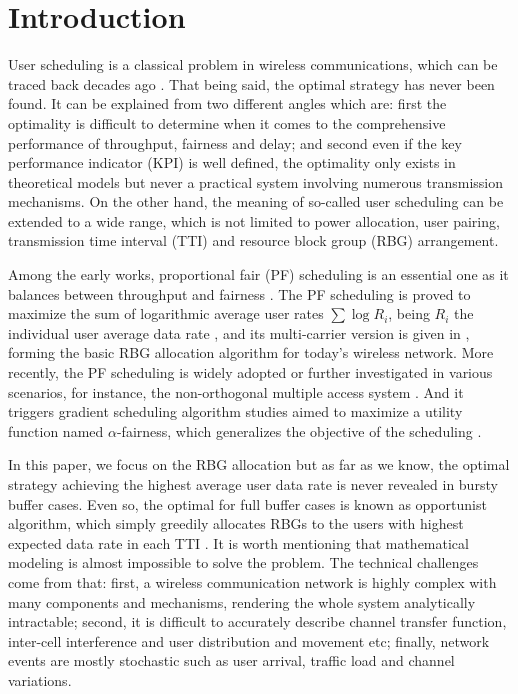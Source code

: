 \documentclass[conference,compsocconf]{IEEEtran}
\begin{document}
	\section{Introduction}
	
	User scheduling is a classical problem in wireless communications, which can be traced back decades ago \cite{borst2001dynamic}. That being said, the optimal strategy has never been found. It can be explained from two different angles which are: first the optimality is difficult to determine when it comes to the comprehensive performance of throughput, fairness and delay; and second even if the key performance indicator (KPI) is well defined, the optimality only exists in theoretical models but never a practical system involving numerous transmission mechanisms. On the other hand, the meaning of so-called user scheduling can be extended to a wide range, which is not limited to power allocation, user pairing, transmission time interval (TTI) and resource block group (RBG) arrangement.

    Among the early works, proportional fair (PF) scheduling is an essential one as it balances between throughput and fairness \cite{tse2001multiuser}. The PF scheduling is proved to maximize the sum of logarithmic average user rates $\sum \log R_i$, being $R_i$ the individual user average data rate \cite{kelly1998rate}, and its multi-carrier version is given in \cite{kim2005proportional}, forming the basic RBG allocation algorithm for today's wireless network. More recently, the PF scheduling is widely adopted or further investigated in various scenarios, for instance, the non-orthogonal multiple access system \cite{gemici2019user,saito2015system}. And it triggers gradient scheduling algorithm studies aimed to maximize a utility function named $\alpha$-fairness, which generalizes the objective of the scheduling \cite{ameigeiras2012traffic}.
    
    In this paper, we focus on the RBG allocation but as far as we know, the optimal strategy achieving the highest average user data rate is never revealed in bursty buffer cases. Even so, the optimal for full buffer cases is known as opportunist algorithm, which simply greedily allocates RBGs to the users with highest expected data rate in each TTI \cite{borst2001dynamic}. It is worth mentioning that mathematical modeling is almost impossible to solve the problem. The technical challenges come from that: first, a wireless communication network is highly complex with many components and mechanisms, rendering the whole system analytically intractable; second, it is difficult to accurately describe channel transfer function, inter-cell interference and user distribution and movement etc; finally, network events are mostly stochastic such as user arrival, traffic load and channel variations. 
	
\end{document}
